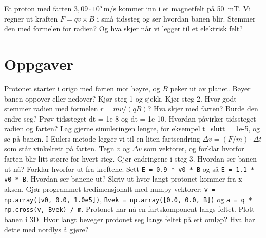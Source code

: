 \documentclass[11pt]{article}
\begin{document}

Et proton med farten $3{,}09 \cdot 10^{5}\,\mathrm{m/s}$ kommer inn i et magnetfelt på 50~mT. Vi regner ut kraften $F = qv \times B$ i små tidssteg og ser hvordan banen blir. Stemmer den med formelen for radien? Og hva skjer når vi legger til et elektrisk felt?

\section*{Oppgaver}

\begin{oppgaveliste}
\oppgave {}Protonet starter i origo med farten mot høyre, og $B$ peker ut av planet. Bøyer banen oppover eller nedover? Kjør steg 1 og sjekk.
\svar
\oppgave {}Kjør steg 2. Hvor godt stemmer radien med formelen $r = mv/(qB)$? Hva skjer med farten? Burde den endre seg?
\svar
\oppgave {}Prøv tidssteget dt = 1e-8 og dt = 1e-10. Hvordan påvirker tidssteget radien og farten? Lag gjerne simuleringen lengre, for eksempel t\_slutt = 1e-5, og se på banen.
\svar
\oppgave {}I Eulers metode legger vi til en liten fartsendring $Δv = (F/m) \cdot Δt$ som står vinkelrett på farten. Tegn $v$ og $Δv$ som vektorer, og forklar hvorfor farten blir litt større for hvert steg.
\svar
\oppgave {}Gjør endringene i steg 3. Hvordan ser banen ut nå? Forklar hvorfor ut fra kreftene.
\svar
\oppgave {}Sett \texttt{E = 0.9 * v0 * B} og så \texttt{E = 1.1 * v0 * B}. Hvordan ser banene ut? Skriv ut hvor langt protonet kommer fra x-aksen.
\svar
\oppgave {}Gjør programmet tredimensjonalt med numpy-vektorer: \texttt{v = np.array([v0, 0.0, 1.0e5])}, \texttt{Bvek = np.array([0.0, 0.0, B])} og \texttt{a = q * np.cross(v, Bvek) / m}. Protonet har nå en fartskomponent langs feltet. Plott banen i 3D. Hvor langt beveger protonet seg langs feltet på ett omløp? Hva har dette med nordlys å gjøre?
\svar
\end{oppgaveliste}
\end{document}
